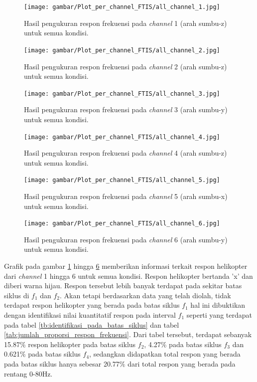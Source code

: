 \begin{figure}[H]
	\centering
	\texttt{[image: gambar/Plot\_per\_channel\_FTIS/all\_channel\_1.jpg]}
	\caption{Hasil pengukuran respon frekuensi pada \textit{channel} 1 (arah sumbu-z) untuk semua kondisi.}
	\label{fig:channel_1}
\end{figure}

\begin{figure}[h]
	\centering
	\texttt{[image: gambar/Plot\_per\_channel\_FTIS/all\_channel\_2.jpg]}
	\caption{Hasil pengukuran respon frekuensi pada \textit{channel} 2 (arah sumbu-z) untuk semua kondisi.}
	\label{fig:channel_2}
\end{figure}

\begin{figure}[]
	\centering
	\texttt{[image: gambar/Plot\_per\_channel\_FTIS/all\_channel\_3.jpg]}
	\caption{Hasil pengukuran respon frekuensi pada \textit{channel} 3 (arah sumbu-y) untuk semua kondisi.}
	\label{fig:channel_3}
\end{figure}

\begin{figure}[H]
	\centering
	\texttt{[image: gambar/Plot\_per\_channel\_FTIS/all\_channel\_4.jpg]}
	\caption{Hasil pengukuran respon frekuensi pada \textit{channel} 4 (arah sumbu-z) untuk semua kondisi.}
	\label{fig:channel_4}
\end{figure}

\begin{figure}[h]
	\centering
	\texttt{[image: gambar/Plot\_per\_channel\_FTIS/all\_channel\_5.jpg]}
	\caption{Hasil pengukuran respon frekuensi pada \textit{channel} 5 (arah sumbu-x) untuk semua kondisi.}
	\label{fig:channel_5}
\end{figure}

\begin{figure}[H]
	\centering
	\texttt{[image: gambar/Plot\_per\_channel\_FTIS/all\_channel\_6.jpg]}
	\caption{Hasil pengukuran respon frekuensi pada \textit{channel} 6 (arah sumbu-y) untuk semua kondisi.}
	\label{fig:channel_6}
\end{figure}

Grafik pada gambar \ref{fig:channel_1} hingga \ref{fig:channel_6} memberikan informasi terkait respon helikopter dari \textit{channel} 1 hingga 6 untuk semua kondisi. Respon helikopter bertanda 'x' dan diberi warna hijau. Respon tersebut lebih banyak terdapat pada sekitar batas siklus di $f_1$ dan $f_2$. Akan tetapi berdasarkan data yang telah diolah, tidak terdapat respon helikopter yang berada pada batas siklus $f_1$ hal ini dibuktikan dengan identifikasi nilai kuantitatif respon pada interval $f_1$ seperti yang terdapat pada tabel \ref{tb:identifikasi_pada_batas_siklus} dan tabel \ref{tab:jumlah_proporsi_respon_frekuensi}. Dari tabel tersebut, terdapat sebanyak 15.87$\%$ respon helikopter pada batas siklus $f_2$, 4.27$\%$ pada batas siklus $f_3$ dan 0.621$\%$ pada batas siklus $f_4$, sedangkan didapatkan total respon yang berada pada batas siklus hanya sebesar 20.77$\%$ dari total respon yang berada pada rentang 0-80Hz. 


